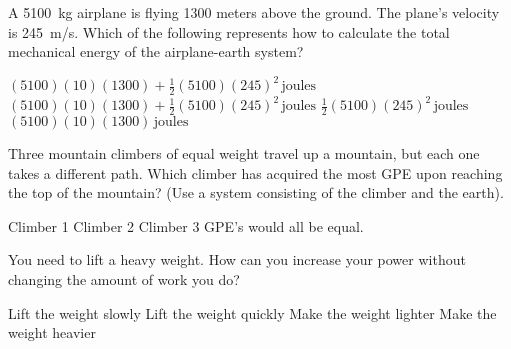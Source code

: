 \documentclass[]{exam}
\begin{document}
\begin{questions}
\question
A \SI{5100}{kg} airplane is flying 1300 meters above the ground. The plane's velocity is \SI{245}{m/s}. Which of the following represents how to calculate the total mechanical energy of the airplane-earth system?

\begin{randomizechoices}
    \smallskip
    \correctchoice $(5100)(10)(1300) + \frac{1}{2}(5100)(245)^2\,\text{joules}$ \smallskip
    \choice $(5100)(10)(1300) + \frac{1}{2}(5100)(245)^2\,\text{joules}$ \smallskip
    \choice $ \frac{1}{2}(5100)(245)^2\,\text{joules}$\smallskip
    \choice $(5100)(10)(1300)\,\text{joules}$\smallskip
\end{randomizechoices}

\question
Three mountain climbers of equal weight travel up a mountain, but each one takes a different path. Which climber has acquired the most GPE upon reaching the top of the mountain? (Use a system consisting of the climber and the earth).

\begin{minipage}{0.4\textwidth}
    \begin{randomizechoices}[norandomize]
        \choice Climber 1
        \choice Climber 2
        \choice Climber 3
        \correctchoice GPE's would all be equal.
    \end{randomizechoices}
\end{minipage}%
\begin{minipage}{0.5\textwidth}
    \centering
\end{minipage}

\question 
You need to lift a heavy weight. How can you increase your power without changing the amount of work you do?

\begin{randomizechoices}
    \choice Lift the weight slowly
    \correctchoice Lift the weight quickly
    \choice Make the weight lighter
    \choice Make the weight heavier
\end{randomizechoices}


\end{questions}
\end{document}
